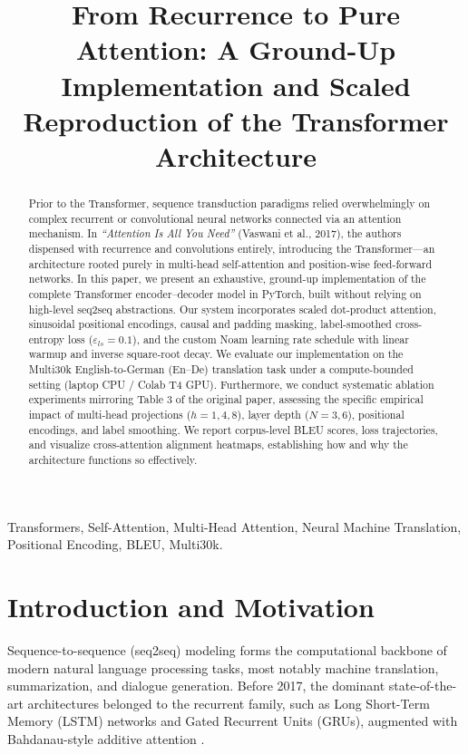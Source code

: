 \documentclass[conference]{IEEEtran}
\begin{document}
\title{From Recurrence to Pure Attention: A Ground-Up Implementation and Scaled Reproduction of the Transformer Architecture}

\author{
}

\maketitle

\begin{abstract}
Prior to the Transformer, sequence transduction paradigms relied overwhelmingly on complex recurrent or convolutional neural networks connected via an attention mechanism. In \textit{``Attention Is All You Need''} (Vaswani et al., 2017), the authors dispensed with recurrence and convolutions entirely, introducing the Transformer---an architecture rooted purely in multi-head self-attention and position-wise feed-forward networks. In this paper, we present an exhaustive, ground-up implementation of the complete Transformer encoder--decoder model in PyTorch, built without relying on high-level seq2seq abstractions. Our system incorporates scaled dot-product attention, sinusoidal positional encodings, causal and padding masking, label-smoothed cross-entropy loss ($\varepsilon_{ls} = 0.1$), and the custom Noam learning rate schedule with linear warmup and inverse square-root decay. We evaluate our implementation on the Multi30k English-to-German (En--De) translation task under a compute-bounded setting (laptop CPU / Colab T4 GPU). Furthermore, we conduct systematic ablation experiments mirroring Table 3 of the original paper, assessing the specific empirical impact of multi-head projections ($h=1, 4, 8$), layer depth ($N=3, 6$), positional encodings, and label smoothing. We report corpus-level BLEU scores, loss trajectories, and visualize cross-attention alignment heatmaps, establishing how and why the architecture functions so effectively.
\end{abstract}

\begin{IEEEkeywords}
Transformers, Self-Attention, Multi-Head Attention, Neural Machine Translation, Positional Encoding, BLEU, Multi30k.
\end{IEEEkeywords}

\section{Introduction and Motivation}
Sequence-to-sequence (seq2seq) modeling forms the computational backbone of modern natural language processing tasks, most notably machine translation, summarization, and dialogue generation. Before 2017, the dominant state-of-the-art architectures belonged to the recurrent family, such as Long Short-Term Memory (LSTM) networks \cite{sutskever2014sequence} and Gated Recurrent Units (GRUs), augmented with Bahdanau-style additive attention \cite{bahdanau2014neural}. 
\end{document}
